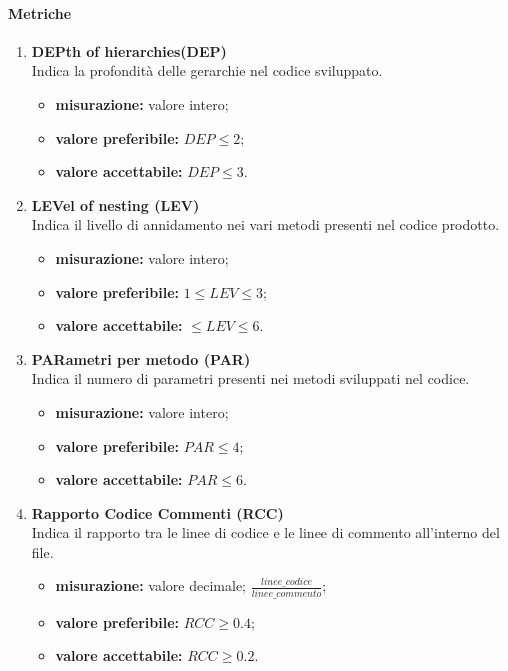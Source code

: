\paragraph{Metriche}
\begin{enumerate}
	\item[]

	      \textbf{DEPth of hierarchies(DEP)}\\
	      Indica la profondità delle gerarchie nel codice sviluppato.
	      \begin{itemize}
		      \item \textbf{misurazione:} valore intero;
		      \item \textbf{valore preferibile:} $DEP\leq2$;
		      \item \textbf{valore accettabile:} $DEP\leq3$.
	      \end{itemize}
	      \pagebreak
	\item[]
	      \textbf{LEVel of nesting (LEV)}\\
	      Indica il livello di annidamento nei vari metodi presenti nel codice prodotto.
	      \begin{itemize}
		      \item \textbf{misurazione:} valore intero;
		      \item \textbf{valore preferibile:} $1\leq LEV\leq3$;
		      \item \textbf{valore accettabile:} $\leq LEV\leq6$.
	      \end{itemize}
	\item[]
	      \textbf{PARametri per metodo (PAR)}\\
	      Indica il numero di parametri presenti nei metodi sviluppati nel codice.
	      \begin{itemize}
		      \item \textbf{misurazione:} valore intero;
		      \item \textbf{valore preferibile:} $PAR\leq 4$;
		      \item \textbf{valore accettabile:} $PAR\leq 6$.
	      \end{itemize}
	\item[]
	      \textbf{Rapporto Codice Commenti (RCC)}\\
	      Indica il rapporto tra le linee di codice e le linee di commento all'interno del file.
	      \begin{itemize}
		      \item \textbf{misurazione:} valore decimale; $\frac{linee\_codice}{linee\_commento}$;
		      \item \textbf{valore preferibile:} $RCC\geq 0.4$;
		      \item \textbf{valore accettabile:} $RCC\geq 0.2$.
	      \end{itemize}
\end{enumerate}

